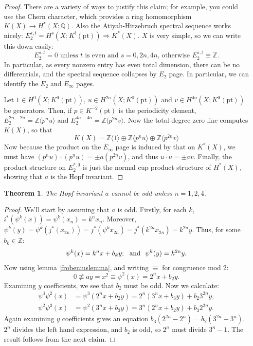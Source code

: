 \documentclass{article}
\newcommand{\Z}{\mathbb{Z}}
\newcommand{\Q}{\mathbb{Q}}
\newcommand{\ptspace}{\mathrm{pt}}
\renewcommand{\to}{\longrightarrow}
\newtheorem{thm}{Theorem}[section]
\theoremstyle{definition}
\begin{document}
\begin{proof}
There are a variety of ways to justify this claim; for example, you could use the Chern character, which provides a ring homomorphism $K(X) \to H^*(X; \Q)$.  Also the Atiyah-Hirzebruch spectral sequence works nicely: $E_2^{s, t} = H^s(X; K^t(\ptspace)) \Rightarrow K^*(X)$.  $X$ is very simple, so we can write this down easily:
\[E_2^{s,t}=0\text{ unless $t$ is even and $s=0,2n,4n$, otherwise $E_2^{s,t}\equiv\Z$.}\]
In particular, as every nonzero entry has even total dimension, there can be no differentials, and the spectral sequence collapses by $E_2$ page. In particular, we can identify the $E_2$ and $E_\infty$ pages.

Let $1\in H^{0}(X;K^0(\ptspace))$, $u\in H^{2n}(X;K^0(\ptspace))$ and $v\in H^{4n}(X;K^0(\ptspace))$ be generators. Then, if $p\in K^{-2}(\ptspace)$ is the periodicity element, $E_2^{2n,-2n}=\Z\langle p^nu\rangle$ and $E_2^{4n,-4n}=\Z\langle p^{2n}v\rangle$.
Now the total degree zero line computes $K(X)$, so that 
\[K(X)= 
\Z\langle1\rangle\oplus
\Z\langle p^nu\rangle\oplus
\Z\langle p^{2n}v\rangle\]
Now because the product on the $E_\infty$ page is induced by that on $K^*(X)$, we must have $(p^nu)\cdot(p^nu)=\pm a(p^{2n}v)$, and thus $u\cdot u=\pm av$. Finally, the product structure on $E_2^{*,0}$ is just the normal cup product structure of $H^*(X)$, showing that $a$ is the Hopf invariant.
%
\end{proof}
\begin{thm}
The Hopf invariant $a$ cannot be odd unless $n = 1, 2, 4$.
\end{thm}
\begin{proof}
We'll start by assuming that $a$ is odd.
Firstly, for each $k$, $i^*(\psi^k(x))=\psi^k(x_n)=k^nx_n$. Moreover, $\psi^k(y)=\psi^k(j^*(x_{2n}))=j^*(\psi^kx_{2n})
=j^*(k^{2n}x_{2n})=k^{2n}y$. Thus, for some $b_k\in\Z$:
\[\psi^k(x)=k^nx+b_ky;\textup{ \ and \ }\psi^k(y)=k^{2n}y.\]
Now using lemma \ref{frobeniuslemma}, and writing $\equiv$ for congruence mod 2:
\[0\not\equiv ay=x^2\equiv\psi^2(x)=2^nx+b_2y.\]
Examining $y$ coefficients, we see that $b_2$ must be odd. Now we calculate:
\begin{align*}
\psi^3 \psi^2(x) & = \psi^3(2^n x + b_2 y) = 2^n(3^n x + b_3 y) + b_2 3^{2n} y, \\
\psi^2 \psi^3(x) & = \psi^2(3^n x + b_3 y) = 3^n(2^n x + b_2 y) + b_3 2^{2n} y.
\end{align*}
Again examining $y$ coefficients gives an equation $b_3(2^{2n} - 2^n) = b_2(3^{2n} - 3^n)$.  $2^n$ divides the left hand expression, and $b_2$ is odd, so $2^n$ must divide $3^n - 1$. The result follows from the next claim.
\end{proof}
\end{document}
